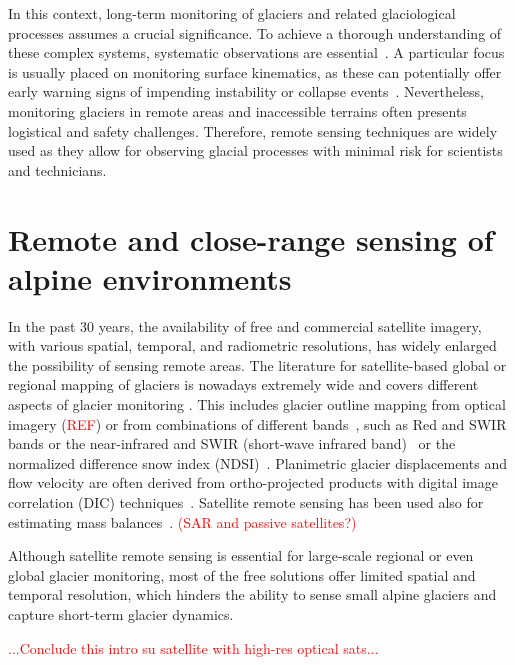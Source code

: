 In this context, long-term monitoring of glaciers and related glaciological processes assumes a crucial significance.
To achieve a thorough understanding of these complex systems, systematic observations are essential~\citep{Kaab2005}.
A particular focus is usually placed on monitoring surface kinematics, as these can potentially offer early warning signs of impending instability or collapse events~\citep{Faillettaz2015}.
Nevertheless, monitoring glaciers in remote areas and inaccessible terrains often presents logistical and safety challenges.
Therefore, remote sensing techniques are widely used as they allow for observing glacial processes with minimal risk for scientists and technicians. 

\section{Remote and close-range sensing of alpine environments}

In the past 30 years, the availability of free and commercial satellite imagery, with various spatial, temporal, and radiometric resolutions, has widely enlarged the possibility of sensing remote areas.
The literature for satellite-based global or regional mapping of glaciers is nowadays extremely wide and covers different aspects of glacier monitoring \citep{Paul2007}. 
This includes glacier outline mapping from optical imagery (\textcolor{red}{REF}) or from combinations of different bands~\citep{Winsvold2016}, such as Red and SWIR bands or the near-infrared and SWIR (short-wave infrared band)~\citep{Paul_2002} or the normalized difference snow index (NDSI)~\citep{Hall1995}.
Planimetric glacier displacements and flow velocity are often derived from ortho-projected products with digital image correlation (DIC) techniques~\citep{Scambos1992, Kaab2005, Scherler2008, altena_kaab_2020}. 
Satellite remote sensing has been used also for estimating mass balances~\citep{Bamber2007, Berthier2016, Rabatel2017, Berthier2023}.
\textcolor{red}{(SAR and passive satellites?)}

Although satellite remote sensing is essential for large-scale regional or even global glacier monitoring, most of the free solutions offer limited spatial and temporal resolution, which hinders the ability to sense small alpine glaciers and capture short-term glacier dynamics. 

\textcolor{red}{...Conclude this intro su satellite with high-res optical sats...}

